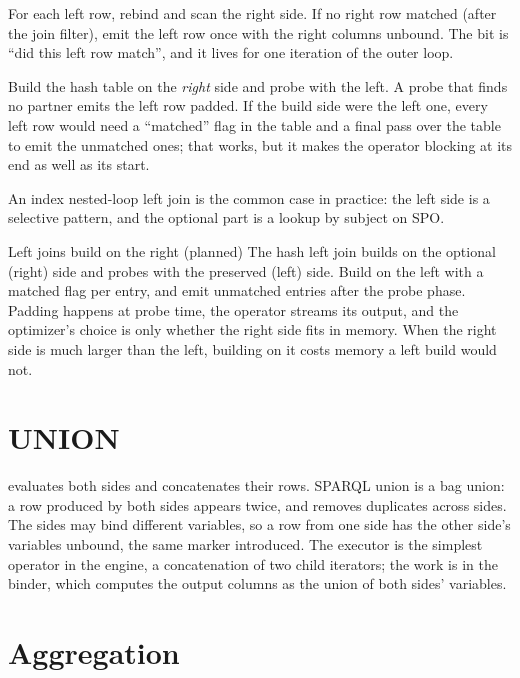 \begin{description}[leftmargin=1.2em]
\item[Nested loop.] For each left row, rebind and scan the right side. If no
right row matched (after the join filter), emit the left row once with the
right columns unbound. The bit is ``did this left row match'', and it lives for
one iteration of the outer loop.
\item[Hash join.] Build the hash table on the \emph{right} side and probe with
the left. A probe that finds no partner emits the left row padded. If the build
side were the left one, every left row would need a ``matched'' flag in the
table and a final pass over the table to emit the unmatched ones; that works,
but it makes the operator blocking at its end as well as its start.
\end{description}

An index nested-loop left join is the common case in practice: the left side
is a selective pattern, and the optional part is a lookup by subject on SPO.

\begin{decision}{Left joins build on the right (planned)}
 The hash left join builds on the optional (right) side and
probes with the preserved (left) side.
 Build on the left with a matched flag per entry, and emit
unmatched entries after the probe phase.
 Padding happens at probe time, the operator streams its output,
and the optimizer's choice is only whether the right side fits in memory.
 When the right side is much larger than the left, building on it
costs memory a left build would not.
\end{decision}

\section{UNION}

 evaluates both sides and concatenates their rows.
SPARQL union is a bag union: a row produced by both sides appears twice, and
 removes duplicates across sides. The sides may bind different
variables, so a row from one side has the other side's variables unbound, the
same marker  introduced. The executor is the simplest operator in
the engine, a concatenation of two child iterators; the work is in the binder,
which computes the output columns as the union of both sides' variables.

\section{Aggregation}

